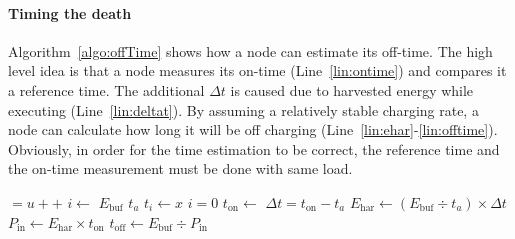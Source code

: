 \paragraph{Timing the death} 
Algorithm~\ref{algo:offTime} shows how a node can estimate its off-time. The high level idea is that a node measures its on-time (Line~\ref{lin:ontime}) and compares it a reference time. The additional $\Delta{t}$ is caused due to harvested energy while executing (Line~\ref{lin:deltat}). By assuming a relatively stable charging rate, a node can calculate how long it will be off charging (Line~\ref{lin:ehar}-\ref{lin:offtime}). Obviously, in order for the time estimation to be correct, the reference time and the on-time measurement must be done with same load.
\begin{algorithm}[t]
    \label{algo:offTime}
    \small
    \begin{algorithmic}[1]
		\State {} $= u{+}{+}$ 
		\State $i \leftarrow $  
		\State $E_\text{buf}$ 
		\State $t_a$ 
		\State$ t_{i} \leftarrow x $ 
		    \State $i=0$
			\State {} 
			\State \label{lin:ontime} $t_\text{on} \leftarrow$  
		\EndIf
			\State \label{lin:deltat}$\Delta{t} = t_\text{on}-t_a$  
			\State \label{lin:ehar}$E_\text{har} \leftarrow (E_\text{buf}\div t_a)\times\Delta{t}$ 
			\State $P_\text{in} \leftarrow E_\text{har}\times{t_\text{on}}$ 
			\State \label{lin:offtime}$t_\text{off} \leftarrow E_\text{buf}\div P_\text{in}$
		\EndIf
	\end{algorithmic}
\end{algorithm}


